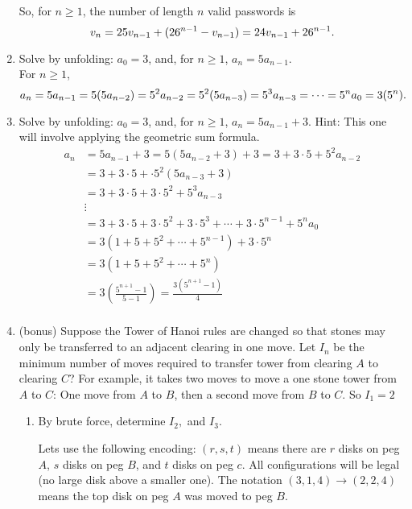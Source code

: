 \documentclass[11pt]{amsart}
\begin{document}
\begin{enumerate}
{So, for $n\geq 1$,  the number of length $n$ valid passwords is
\[
v_n = 25v_{n-1} + (26^{n-1} - v_{n-1}) = 24v_{n-1} + 26^{n-1}.\\[5pt] 
\]
}
 
 \item  Solve by unfolding: $a_0 = 3$, and, for $n\geq 1$, $a_n = 5a_{n-1}$.\\[3pt]
 
 {\color{blue}
 For $n\geq 1$,
 \[
 a_n = 5a_{n-1} = 5(5a_{n-2}) = 5^2a_{n-2} = 5^2(5a_{n-3}) = 5^3a_{n-3} =\cdots = 5^na_0 = 3(5^n).\\[5pt]
 \]
 }

\item  Solve by unfolding:  $a_0 = 3$, and, for $n\geq 1$,  $a_n = 5a_{n-1}+ 3$.
Hint: This one will involve applying the  geometric sum formula.\\[3pt]
{\color{blue}
\begin{align*}
 a_{n} &= 5a_{n-1} + 3 = 5(5a_{n-2}+ 3) + 3 = 3 + 3\cdot 5 + 5^{2}a_{n-2}\\
 &  = 3 + 3\cdot 5 + \cdot 5^{2}(5a_{n-3}+3)\\
 &  = 3 + 3\cdot 5 + 3\cdot 5^{2}+ 5^{3}a_{n-3}\\
 &\vdots\\
 & = 3 + 3\cdot 5 + 3\cdot 5^{2}+ 3\cdot5^{3}+ \cdots +3\cdot 5^{n-1}+ 5^{n}a_{0}\\
 & =3(1 + 5 + 5^{2}+\cdots +5^{n-1}) + 3\cdot 5^{n}\\
 & = 3 (1 + 5 + 5^{2}+\cdots +5^{n})\\
 & = 3\left(\frac{5^{n+1} - 1}{5-1}\right)= \frac{3(5^{n+1}-1)}{4}\\[5pt]
 \end{align*}
 }



\item (bonus) Suppose the Tower of Hanoi rules are changed so that stones may only be transferred
to an adjacent clearing in one move. Let $I_n$ be  the minimum number of moves required 
to transfer tower from clearing $A$ to clearing $C$? 
For example, it takes two moves to move a one stone tower from $A$ to $C$: One move from $A$ to $B$, then a second move from $B$ to $C$. So $I_1 = 2$\\[3pt]

\begin{enumerate}
\item  By brute force, determine  $I_2,$ and $I_3$. \\[3pt]
{ \color{blue}
Lets use the following encoding: $(r,s,t)$ means there are $r$ disks on peg $A$, $s$ disks on peg $B$, and $t$ disks on peg $c$. All configurations will be legal (no large disk above a smaller one). The notation $(3, 1, 4)\to(2,2,4)$ means the top disk on peg $A$ was moved to peg $B$.

}
\end{enumerate}
\end{enumerate}
\end{document}
